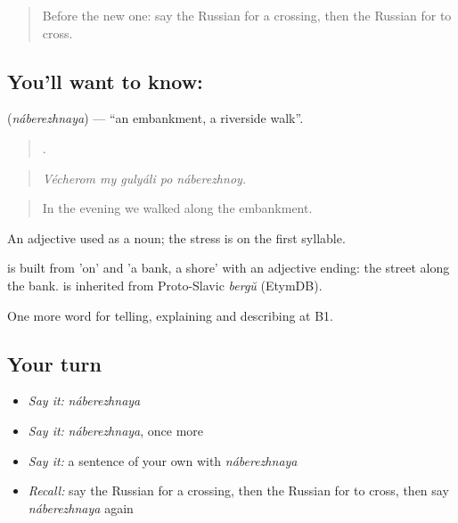 \label{lesson:RU-C440-naberezhnaya}



\begin{quote}
Before the new one: say the Russian for a crossing, then the Russian for to cross.
\end{quote}

\subsection*{You'll want to know: }
\textbf{} (\emph{náberezhnaya}) — \textquotedblleft{}an embankment, a riverside walk\textquotedblright{}.

\begin{quote}
    .
\end{quote}

\begin{quote}
\emph{Vécherom my gulyáli po náberezhnoy.}
\end{quote}

\begin{quote}
In the evening we walked along the embankment.
\end{quote}

An adjective used as a noun; the stress is on the first syllable.

\begin{cousinweb}
\emph{} is built from \emph{} 'on' and \emph{} 'a bank, a shore' with an adjective ending: the street along the bank. \emph{} is inherited from Proto-Slavic \emph{bergŭ} (EtymDB).
\end{cousinweb}

\begin{grammarlens}[title={What you've built}]
One more word for telling, explaining and describing at B1.
\end{grammarlens}

\subsection*{Your turn}
\begin{itemize}
\raggedright
  \item \emph{Say it:} \emph{náberezhnaya}
  \item \emph{Say it:} \emph{náberezhnaya}, once more
  \item \emph{Say it:} a sentence of your own with \emph{náberezhnaya}
  \item \emph{Recall:} say the Russian for a crossing, then the Russian for to cross, then say \emph{náberezhnaya} again
\end{itemize}

